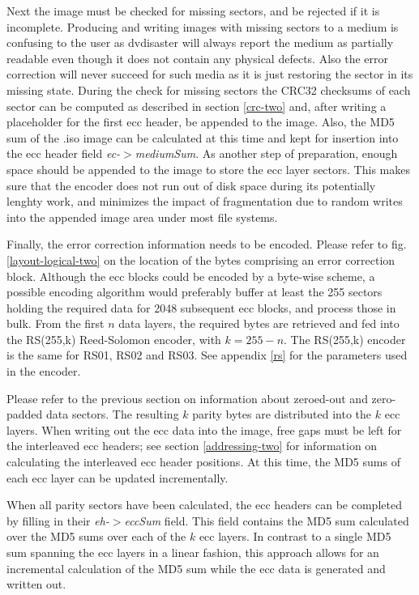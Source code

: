 \medskip

Next the image must be checked for missing sectors, and be rejected
if it is incomplete. Producing and
writing images with missing sectors to a medium is
confusing to the user as dvdisaster will always report 
the medium as partially readable even though it does not contain
any physical defects. Also the error correction will never
succeed for such media as it is just restoring the sector
in its missing  state. 
During the check for missing sectors the CRC32 checksums 
of each sector can be computed as described in section \ref{crc-two} and, 
after writing a placeholder for the first ecc header, be appended to the image.
Also, the MD5 sum of the .iso image can be calculated at this time and
kept for insertion into the ecc header field {\em ec-$>$mediumSum}.
As another step of preparation, enough space should be appended
to the image to store the ecc layer sectors. This makes sure
that the encoder does not run out of disk space during
its potentially lenghty work, and minimizes the impact of
fragmentation due to random writes into the appended 
image area under most file systems.

\medskip

Finally, the error correction information needs to be encoded.
Please refer to fig. \ref{layout-logical-two} on the location
of the bytes comprising an error correction block.
Although the ecc blocks could be encoded by a byte-wise scheme, 
a possible encoding algorithm would preferably buffer at least the 
255 sectors holding the required data for 2048 subsequent ecc
blocks, and process those in bulk. From the first $n$ data layers,
the required bytes are retrieved and fed into the RS(255,k)
Reed-Solomon encoder, with $k = 255 -n$. The RS(255,k) encoder 
is the same for RS01, RS02 and RS03. See
appendix \ref{rs} for the parameters used in the encoder.
 
Please refer to
the previous section on information about zeroed-out and
zero-padded data sectors. The resulting $k$ parity bytes
are distributed into the $k$ ecc layers. When writing out
the ecc data into the image, free gaps must be left for
the interleaved ecc headers; see section
\ref{addressing-two} for information on calculating the
interleaved ecc header positions. At this time, the MD5
sums of each ecc layer can be updated incrementally. 

\medskip

When all parity sectors have been calculated, the ecc headers
can be completed by filling in their {\em eh-$>$eccSum} field.
This field contains the MD5 sum calculated over the MD5 sums
over each of the $k$ ecc layers. In contrast to a single MD5
sum spanning the ecc layers in a linear fashion, this
approach allows for an incremental calculation of the MD5 sum
while the ecc data is generated and written out. 
